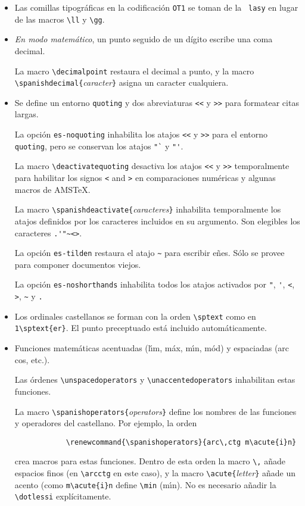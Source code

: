 \begin{itemize}
    \item Las comillas tipográficas en la codificación \verb|OT1| se toman de la \fontnomo\ \verb|lasy| en lugar de las macros \verb|\ll| y \verb|\gg|.
    \item \emph{En modo matemático}, un punto seguido de un dígito escribe una coma decimal.

    La macro \verb|\decimalpoint| restaura el decimal a punto, y la macro \verb|\spanishdecimal{|\emph{caracter}\verb|}| asigna     un caracter cualquiera.

    \item Se define un entorno \verb|quoting| y dos abreviaturas \verb|<<| y \verb|>>| para formatear citas largas.

    La opción \verb|es-noquoting| inhabilita los atajos \verb|<<| y \verb|>>| para el entorno \verb|quoting|, pero se conservan los atajos \verb|"`| y \verb|"'|.

    La macro \verb|\deactivatequoting| desactiva los atajos \verb|<<| y \verb|>>| temporalmente para habilitar los signos \verb|<| and \verb|>| en comparaciones numéricas y algunas macros de AMS\TeX. 

    La macro \verb|\spanishdeactivate{|\emph{caracteres}\verb|}| inhabilita temporalmente los atajos definidos por los caracteres incluidos en su argumento. Son elegibles los caracteres \verb|.'"~<>|. %

    La opción \verb|es-tilden| restaura el atajo \verb|~| para escribir eñes. Sólo se provee para componer documentos viejos.

    La opción \verb|es-noshorthands| inhabilita todos los atajos activados por \verb|"|, \verb|'|, \verb|<|, \verb|>|, \verb|~| y \verb|.|

    \item Los ordinales castellanos se forman con la orden \verb|\sptext| como en \verb|1\sptext{er}|. El punto preceptuado está incluido automáticamente.
    \item Funciones matemáticas acentuadas (l\'\i m, m\'ax, m\'\i n, m\'od) y espaciadas (arc\,cos, etc.). 

    Las órdenes \verb|\unspacedoperators| y \verb|\unaccentedoperators| inhabilitan estas funciones.  

    La macro \verb|\spanishoperators{|\emph{operators}\verb|}| define los nombres de las funciones y operadores del castellano.  Por ejemplo, la orden 
        \begin{verbatim}
            \renewcommand{\spanishoperators}{arc\,ctg m\acute{i}n}
        \end{verbatim}
    crea macros para estas funciones. Dentro de esta orden la macro \verb|\,| añade espacios finos (en \verb|\arcctg| en este caso), y la macro \verb|\acute{|\emph{letter}\verb|}| añade un acento (como \verb|m\acute{i}n| define \verb|\min| (m\'\i{}n). No es necesario añadir la \verb|\dotlessi| explícitamente.


\end{itemize}
